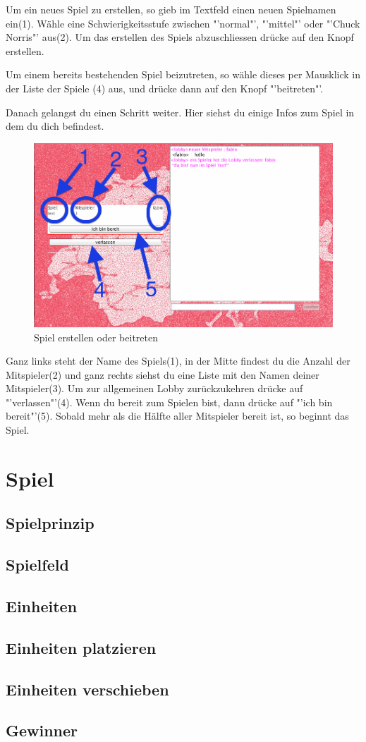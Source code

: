 \documentclass[ngerman, 12pt, pdftex]{scrartcl}[2006/07/30]
\begin{document}
Um ein neues Spiel zu erstellen, so gieb im Textfeld einen neuen Spielnamen ein(1).
W\"{a}hle eine Schwierigkeitsstufe zwischen "'normal"', "'mittel"' oder "'Chuck Norris"' aus(2).
Um das erstellen des Spiels abzuschliessen dr\"{u}cke auf den Knopf erstellen.

Um einem bereits bestehenden Spiel beizutreten, so w\"{a}hle dieses per Mausklick in der Liste der Spiele (4) aus, und dr\"{u}cke dann auf den Knopf "'beitreten"'.

Danach gelangst du einen Schritt weiter. Hier siehst du einige Infos zum Spiel in dem du dich befindest.

\begin{figure}[h]
\centering
\includegraphics[scale=0.3]{lobby/spielinfos.png}
\caption{Spiel erstellen oder beitreten}
\end{figure}

 Ganz links steht der Name des Spiels(1), in der Mitte findest du die Anzahl der Mitspieler(2) und ganz rechts siehst du eine Liste mit den Namen deiner Mitspieler(3).
Um zur allgemeinen Lobby zur\"{u}ckzukehren dr\"{u}cke auf "'verlassen"'(4).
Wenn du bereit zum Spielen bist, dann dr\"{u}cke auf "'ich bin bereit"'(5). Sobald mehr als die Hälfte aller Mitspieler bereit ist, so beginnt das Spiel.

\newpage

\section{Spiel}
\subsection{Spielprinzip}

\subsection{Spielfeld}

\subsection{Einheiten}

\subsection{Einheiten platzieren}

\subsection{Einheiten verschieben}

\subsection{Gewinner}
\end{document}
